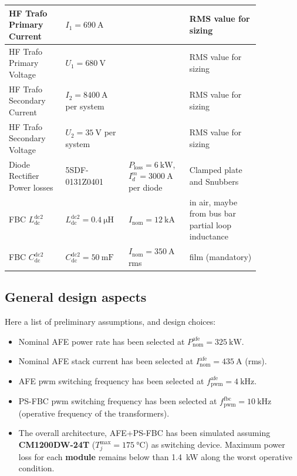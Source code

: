 \documentclass[12pt,a4paper]{scrartcl}
\begin{document}
\begin{onehalfspace}
\begin{center}
\begin{longtable}{p{0.2\linewidth}|p{0.2\linewidth}|p{0.2\linewidth}|p{0.25\linewidth}}
		\midrule
		HF Trafo Primary Current & $I_1 = \SI{690}{\ampere}$ &  & RMS value for sizing  \\		
		\midrule
		HF Trafo Primary Voltage & $U_1 = \SI{680}{\volt}$ &  &  RMS value for sizing \\		
		\midrule
		HF Trafo Secondary Current & $I_2 = \SI{8400}{\ampere}$ per system &  & RMS value for sizing \\
		\midrule
		HF Trafo Secondary Voltage & $U_2 = \SI{35}{\volt}$ per system &  & RMS value for sizing \\
		\midrule
		Diode Rectifier Power losses & 5SDF-0131Z0401 &   $P_\text{loss} =  \SI{6}{\kilo\watt}$, $I_d^m = \SI{3000}{\ampere}$ per diode & Clamped plate and Snubbers \\
		\midrule
		FBC $L_\text{dc}^\text{dc2}$ & $L_\text{dc}^\text{dc2} = \SI{0.4}{\micro\henry}$ & $I_\text{nom} = \SI{12}{\kilo\ampere}$ & in air, maybe from bus bar partial loop inductance \\
		\midrule
		FBC $C_\text{dc}^\text{dc2}$ & $C_\text{dc}^\text{dc2} = \SI{50}{\milli\farad}$ & $I_\text{nom} = \SI{350}{\ampere}$ rms & film (mandatory) \\
		\bottomrule
	\end{longtable}
\end{center}

\subsection{General design aspects}
Here a list of preliminary assumptions, and design choices:
\begin{itemize}
	\item[--] Nominal AFE power rate has been selected at $P_\text{nom}^\text{afe} = \SI{325}{\kilo\watt}$.
	\item[--] Nominal AFE stack current has been selected at $I_\text{nom}^\text{afe} = \SI{435}{\ampere}$ (rms).
	\item[--] AFE pwm switching frequency has been selected at $f_\text{pwm}^\text{afe} = \SI{4}{\kilo\hertz}$.
	\item[--] PS-FBC pwm switching frequency has been selected at $f_\text{pwm}^\text{fbc} = \SI{10}{\kilo\hertz}$ (operative frequency of the transformers).
	\item[--] The overall architecture, AFE+PS-FBC has been simulated assuming \textbf{CM1200DW-24T} ($T_j^\text{max} = \SI{175}{\celsius}$) as switching device. Maximum power loss for each \textbf{module} remains below than \SI{1.4}{\kilo\watt} along the worst operative condition. 
\end{itemize}


\end{onehalfspace}
\end{document}
